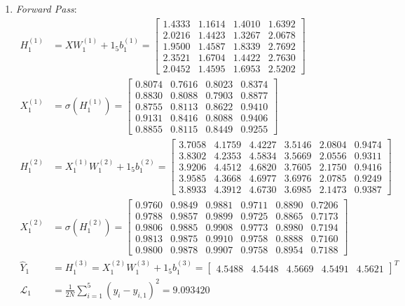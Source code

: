\documentclass[11pt,a4paper]{article}
\def\mathbf#1{#1}%
\theoremstyle{plain}
\theoremstyle{definition}
\theoremstyle{remark}
\begin{document}
\begin{enumerate}
    \item \textit{Forward Pass}:
    \begin{align}
        H^{(1)}_1 &= X W^{(1)}_1 + \mathbf{1}_5 \mathbf{b}^{(1)}_1 = \begin{bmatrix}
            1.4333 & 1.1614 & 1.4010 & 1.6392 \\
            2.0216 & 1.4423 & 1.3267 & 2.0678 \\
            1.9500 & 1.4587 & 1.8339 & 2.7692 \\
            2.3521 & 1.6704 & 1.4422 & 2.7630 \\
            2.0452 & 1.4595 & 1.6953 & 2.5202
        \end{bmatrix} \\[0.2em]
        X^{(1)}_1 &= \sigma\!\left(H^{(1)}_1\right) = \begin{bmatrix}
            0.8074 & 0.7616 & 0.8023 & 0.8374 \\
            0.8830 & 0.8088 & 0.7903 & 0.8877 \\
            0.8755 & 0.8113 & 0.8622 & 0.9410 \\
            0.9131 & 0.8416 & 0.8088 & 0.9406 \\
            0.8855 & 0.8115 & 0.8449 & 0.9255
        \end{bmatrix} \\[0.2em]
        H^{(2)}_1 &= X^{(1)}_1 W^{(2)}_1 + \mathbf{1}_5 \mathbf{b}^{(2)}_1 = \begin{bmatrix}
            3.7058 & 4.1759 & 4.4227 & 3.5146 & 2.0804 & 0.9474 \\
            3.8302 & 4.2353 & 4.5834 & 3.5669 & 2.0556 & 0.9311 \\
            3.9206 & 4.4512 & 4.6820 & 3.7605 & 2.1750 & 0.9416 \\
            3.9585 & 4.3668 & 4.6977 & 3.6976 & 2.0785 & 0.9249 \\
            3.8933 & 4.3912 & 4.6730 & 3.6985 & 2.1473 & 0.9387
        \end{bmatrix} \\[0.2em]
        X^{(2)}_1 &= \sigma\!\left(H^{(2)}_1\right) = \begin{bmatrix}
            0.9760 & 0.9849 & 0.9881 & 0.9711 & 0.8890 & 0.7206 \\
            0.9788 & 0.9857 & 0.9899 & 0.9725 & 0.8865 & 0.7173 \\
            0.9806 & 0.9885 & 0.9908 & 0.9773 & 0.8980 & 0.7194 \\
            0.9813 & 0.9875 & 0.9910 & 0.9758 & 0.8888 & 0.7160 \\
            0.9800 & 0.9878 & 0.9907 & 0.9758 & 0.8954 & 0.7188
        \end{bmatrix} \\[0.2em]
        \hat{Y}_1 &= H^{(3)}_1 = X^{(2)}_1 W^{(3)}_1 + \mathbf{1}_5 \mathbf{b}^{(3)}_1 = \begin{bmatrix} 4.5488 & 4.5448 & 4.5669 & 4.5491 & 4.5621 \end{bmatrix}^T \\[0.2em]
        \mathcal{L}_1 &= \frac{1}{2N} \sum_{i=1}^5 \left( y_i - \hat{y}_{i, 1} \right)^2 = 9.093420
    \end{align}


\end{enumerate}
\end{document}
